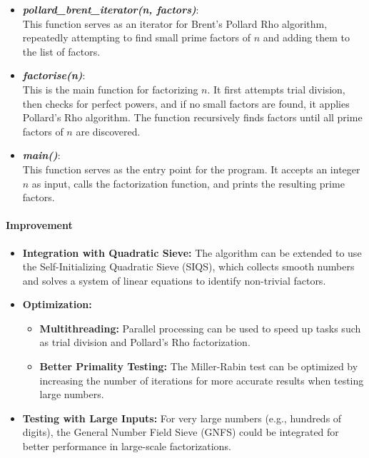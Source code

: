\documentclass[12pt]{report}
\begin{document}
\begin{itemize}
    \item \textbf{\textit{pollard\_brent\_iterator(n, factors)}}: \\
    This function serves as an iterator for Brent's Pollard Rho algorithm, repeatedly attempting to find small prime factors of $n$ and adding them to the list of factors.

    \item \textbf{\textit{factorise(n)}}: \\
    This is the main function for factorizing $n$. It first attempts trial division, then checks for perfect powers, and if no small factors are found, it applies Pollard’s Rho algorithm. The function recursively finds factors until all prime factors of $n$ are discovered.

    \item \textbf{\textit{main()}}: \\
    This function serves as the entry point for the program. It accepts an integer $n$ as input, calls the factorization function, and prints the resulting prime factors.

\end{itemize}


\paragraph{Improvement}

\begin{itemize}
    \item \textbf{Integration with Quadratic Sieve:} The algorithm can be extended to use the Self-Initializing Quadratic Sieve (SIQS), which collects smooth numbers and solves a system of linear equations to identify non-trivial factors.
    \item \textbf{Optimization:} 
    \begin{itemize}
        \item \textbf{Multithreading:} Parallel processing can be used to speed up tasks such as trial division and Pollard’s Rho factorization.
        \item \textbf{Better Primality Testing:} The Miller-Rabin test can be optimized by increasing the number of iterations for more accurate results when testing large numbers.
    \end{itemize}
    \item \textbf{Testing with Large Inputs:} For very large numbers (e.g., hundreds of digits), the General Number Field Sieve (GNFS) could be integrated for better performance in large-scale factorizations.
\end{itemize}
\end{document}
